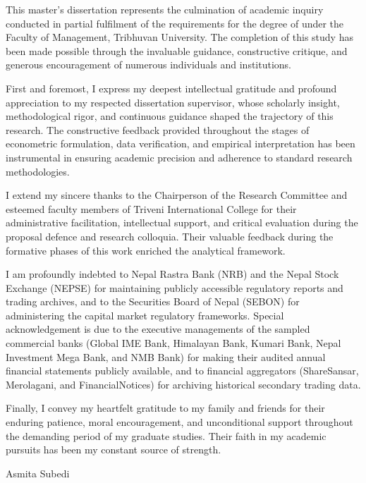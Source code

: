\clearpage
{}
\thispagestyle{plain}

\vspace{0.2cm}

\setlength{\parskip}{3pt}
This master's dissertation represents the culmination of academic inquiry conducted in partial fulfilment of the requirements for the degree of \thesisdegree under the Faculty of Management, Tribhuvan University. The completion of this study has been made possible through the invaluable guidance, constructive critique, and generous encouragement of numerous individuals and institutions.

First and foremost, I express my deepest intellectual gratitude and profound appreciation to my respected dissertation supervisor, whose scholarly insight, methodological rigor, and continuous guidance shaped the trajectory of this research. The constructive feedback provided throughout the stages of econometric formulation, data verification, and empirical interpretation has been instrumental in ensuring academic precision and adherence to standard research methodologies.

I extend my sincere thanks to the Chairperson of the Research Committee and esteemed faculty members of Triveni International College for their administrative facilitation, intellectual support, and critical evaluation during the proposal defence and research colloquia. Their valuable feedback during the formative phases of this work enriched the analytical framework.

I am profoundly indebted to Nepal Rastra Bank (NRB) and the Nepal Stock Exchange (NEPSE) for maintaining publicly accessible regulatory reports and trading archives, and to the Securities Board of Nepal (SEBON) for administering the capital market regulatory frameworks. Special acknowledgement is due to the executive managements of the sampled commercial banks (Global IME Bank, Himalayan Bank, Kumari Bank, Nepal Investment Mega Bank, and NMB Bank) for making their audited annual financial statements publicly available, and to financial aggregators (ShareSansar, Merolagani, and FinancialNotices) for archiving historical secondary trading data.

Finally, I convey my heartfelt gratitude to my family and friends for their enduring patience, moral encouragement, and unconditional support throughout the demanding period of my graduate studies. Their faith in my academic pursuits has been my constant source of strength.

\vspace{0.15cm}

\begin{flushleft}
\singlespacing
Asmita Subedi
\end{flushleft}


